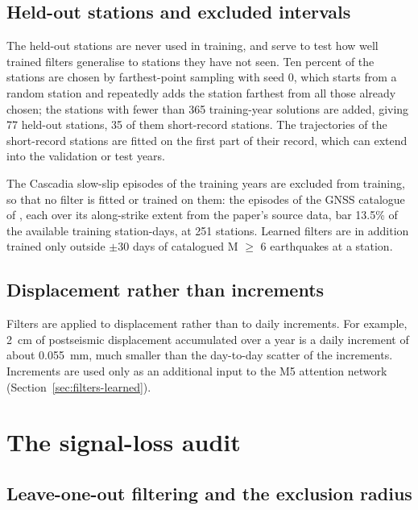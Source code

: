 \documentclass[preprint,12pt,authoryear]{elsarticle}
\begin{document}
\subsection{Held-out stations and excluded intervals}
\label{sec:heldout}

The held-out stations are never used in training, and serve to test how well trained filters generalise to stations they have not seen. Ten percent of the stations are chosen by farthest-point sampling \citep{gonzalez1985} with seed 0, which starts from a random station and repeatedly adds the station farthest from all those already chosen; the stations with fewer than 365 training-year solutions are added, giving 77 held-out stations, 35 of them short-record stations. The trajectories of the short-record stations are fitted on the first part of their record, which can extend into the validation or test years.

The Cascadia slow-slip episodes of the training years are excluded from training, so that no filter is fitted or trained on them: the episodes of the GNSS catalogue of \citet{michel2019}, each over its along-strike extent from the paper's source data, bar 13.5\% of the available training station-days, at 251 stations. Learned filters are in addition trained only outside $\pm 30$ days of catalogued M $\ge$ 6 earthquakes at a station.

\subsection{Displacement rather than increments}

Filters are applied to displacement rather than to daily increments. For example, 2~cm of postseismic displacement accumulated over a year is a daily increment of about 0.055~mm, much smaller than the day-to-day scatter of the increments. Increments are used only as an additional input to the M5 attention network (Section~\ref{sec:filters-learned}).

\section{The signal-loss audit}
\label{sec:audit}

\subsection{Leave-one-out filtering and the exclusion radius}
\label{sec:loo}
\end{document}
